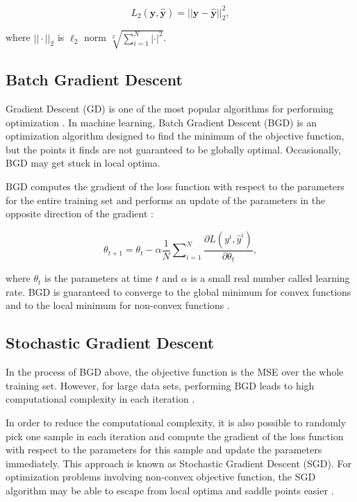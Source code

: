 \documentclass[
	parskip, 			   %
	twoside, 			   %
	DIV=14, 			   %
	BCOR=15.0mm, 		   %
	headsepline, 		   %
	open=right, 		   %
	captions=tableheading, %
	bibliography=totoc,    %
	numbers=noenddot       %
]{scrreprt}
\begin{document}
\begin{equation}
    \label{eq:SE_loss}
    L_{2} ( \mathbf{y}, \hat{\mathbf{y}} ) = ||\mathbf{y}-\hat{\mathbf{y}}||^{2}_{2},
\end{equation}

where $|| \cdot ||_{2}$ is $\ell_2$ norm $\sqrt[2]{\sum_{i=1}^N | \cdot |^2}$.


\subsection{Batch Gradient Descent}
Gradient Descent (GD) is one of the most popular algorithms for performing optimization \cite{ruder2016overview}. In machine learning, Batch Gradient Descent (BGD) is an optimization algorithm designed to find the minimum of the objective function, but the points it finds are not guaranteed to be globally optimal. Occasionally, BGD may get stuck in local optima.

BGD computes the gradient of the loss function with respect to the parameters for the entire training set and performs an update of the parameters in the opposite direction of the gradient \cite{ruder2016overview}:

\begin{equation}
    \label{eq:GD}
    \theta_{t+1} = \theta_{t} - \alpha \frac{1}{N} \sum\nolimits_{i=1}^N  \frac{\partial L (y^i, \hat{y}^i)}{\partial \theta_{t}},
\end{equation}

where $\theta_{t}$ is the parameters at time $t$ and $\alpha$ is a small real number called learning rate. BGD is guaranteed to converge to the global minimum for convex functions and to the local minimum for non-convex functions \cite{ruder2016overview}.

\subsection{Stochastic Gradient Descent}
In the process of BGD above, the objective function is the MSE over the whole training set. However, for large data sets, performing BGD leads to high computational complexity in each iteration \cite{sun2019survey}.

In order to reduce the computational complexity, it is also possible to randomly pick one sample in each iteration and compute the gradient of the loss function with respect to the parameters for this sample and update the parameters immediately. This approach is known as Stochastic Gradient Descent (SGD). For optimization problems involving non-convex objective function, the SGD algorithm may be able to escape from local optima and saddle points easier \cite{sun2019survey}.
\end{document}
